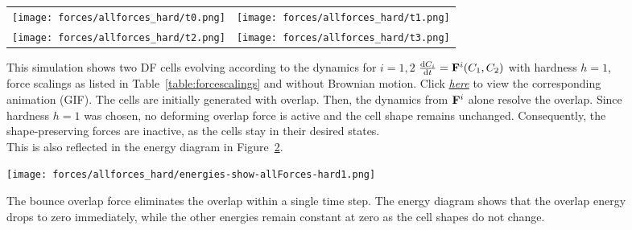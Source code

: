\begin{figure}[h!]
    \centering
    \begin{tabular}{cc}
        \texttt{[image: forces/allforces\_hard/t0.png]} &
        \texttt{[image: forces/allforces\_hard/t1.png]} \\
        \texttt{[image: forces/allforces\_hard/t2.png]} &
        \texttt{[image: forces/allforces\_hard/t3.png]} \\
    \end{tabular}
    \caption{
		This simulation shows two DF cells evolving according to the dynamics for $i = 1, 2$
		$\frac{\mathrm{d} C_i}{\mathrm{d} t} = \mathbf{F}^i(C_1, C_2)$ with hardness $h=1$, force scalings as listed in Table~\ref{table:forcescalings} and without Brownian motion.
		Click \href{https://github.com/tivo476c/FlexibleCellModel/blob/master/figures/gifs/showForces/show-allForces-hard.gif}{\textit{here}} to view the corresponding animation (GIF).
		The cells are initially generated with overlap. 
		Then, the dynamics from $\mathbf{F}^i$ alone resolve the overlap.
		Since hardness $h=1$ was chosen, no deforming overlap force is active and the cell shape remains unchanged. 
		Consequently, the shape-preserving forces are inactive, as the cells stay in their desired states.\\
		This is also reflected in the energy diagram in Figure~\ref{fig:allForces-hardEnergyDiagram}. 
	}
	\label{fig:allForces-hard}
\end{figure}

\begin{figure}[h!]
    \centering
        \texttt{[image: forces/allforces\_hard/energies-show-allForces-hard1.png]} 
    \caption{The bounce overlap force eliminates the overlap within a single time step.
			 The energy diagram shows that the overlap energy drops to zero immediately, while the other energies remain constant at zero as the cell shapes do not change.}
	\label{fig:allForces-hardEnergyDiagram}    
\end{figure}



